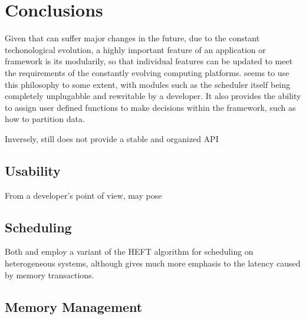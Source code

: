 \documentclass[main.tex]{subfiles}
\begin{document}
\chapter{Conclusions} \label{chapter:conclusions}

Given that \hetplats can suffer major changes in the future, due to the constant techonological evolution, a highly important feature of an application or framework is its modularily, so that individual features can be updated to meet the requirements of the constantly evolving computing platforms. \starpu seems to use this philosophy to some extent, with modules such as the scheduler itself being completely unplugabble and rewritable by a developer. It also provides the ability to assign user defined functions to make decisions within the framework, such as how to partition data.

Inversely, \gama still does not provide a stable and organized API

\section{Usability}


From a developer's point of view, \starpu may pose

\section{Scheduling}

Both \starpu and \gama employ a variant of the \acs{HEFT} algorithm for scheduling on heterogeneous systems, although \starpu gives much more emphasis to the latency caused by memory transactions.

\section{Memory Management}

\end{document}
